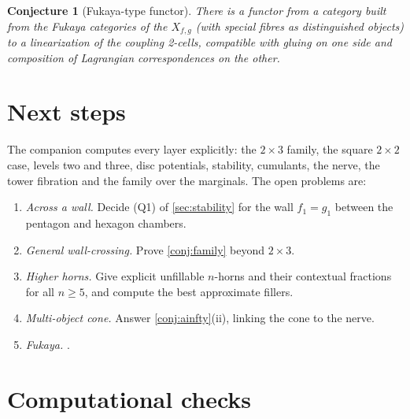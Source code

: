 \documentclass[11pt]{article}
\newtheorem{conjecture}[theorem]{Conjecture}
\theoremstyle{definition}
\theoremstyle{remark}
\begin{document}
\begin{conjecture}[Fukaya-type functor]\label{conj:fukaya}
There is a functor from a category built from the Fukaya categories of the $X_{f,g}$ (with special
fibres as distinguished objects) to a linearization of the coupling 2-cells, compatible with gluing on
one side and composition of Lagrangian correspondences on the other.
\end{conjecture}

\section{Next steps}\label{sec:next}

The companion \cite{Awasthi-Family} computes every layer explicitly: the $2\times3$ family, the square $2\times2$ case,
levels two and three, disc potentials, stability, cumulants, the nerve, the tower fibration and the family over
the marginals. The open problems are:
\begin{enumerate}[label=(\arabic*),leftmargin=*]
\item \emph{Across a wall.} Decide (Q1) of \cref{sec:stability} for the wall $f_1=g_1$ between the pentagon and
  hexagon chambers.
\item \emph{General wall-crossing.} Prove \cref{conj:family} beyond $2\times3$.
\item \emph{Higher horns.} Give explicit unfillable $n$-horns and their contextual fractions for all $n\ge5$, and
  compute the best approximate fillers.
\item \emph{Multi-object cone.} Answer \cref{conj:ainfty}(ii), linking the cone to the nerve.
\item \emph{Fukaya.} .
\end{enumerate}

\section{Computational checks}\label{sec:code}
\end{document}
